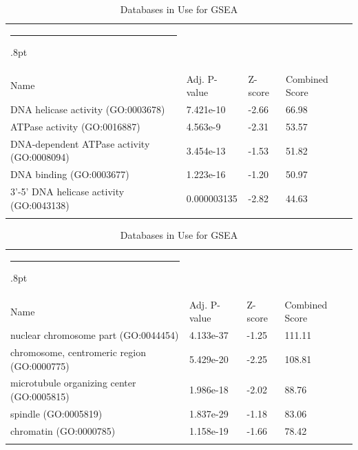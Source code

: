 \documentclass[3p,authoryear,preprint,12pt]{elsarticle}
\makeatletter
\def\hlinewd#1{%
  \noalign{\ifnum0=`}\fi\hrule \@height #1%
  \futurelet\reserved@a\@xhline}
\def\tbltoprule{\hlinewd{.8pt}\\[-12pt]}
\def\tblbottomrule{\noalign{\vspace*{6pt}}\hline\noalign{\vspace*{2pt}}}
\def\tblmidrule{\noalign{\vspace*{6pt}}\hline\noalign{\vspace*{2pt}}}
\makeatother
\begin{document}
\begin{table}[!htbp]
	\caption{{Databases in Use for GSEA} }
	\label{tw-de478ae31cc6}
	\def\arraystretch{1}
	\ignorespaces 
	\centering 
	\begin{tabulary}{\linewidth}{p{\dimexpr.65\tabcolsep}p{\dimexpr.15\tabcolsep}p{\dimexpr.1\tabcolsep}p{\dimexpr.1\tabcolsep}}
		\tbltoprule Name & Adj. P-value & Z-score & Combined Score\\
		\tblmidrule
DNA helicase activity (GO:0003678) & 7.421e-10 & -2.66 & 66.98 \\
ATPase activity (GO:0016887) & 4.563e-9 & -2.31 & 53.57 \\
DNA-dependent ATPase activity (GO:0008094) & 3.454e-13 & -1.53 & 51.82 \\
DNA binding (GO:0003677) & 1.223e-16 & -1.20 & 50.97 \\
3'-5' DNA helicase activity (GO:0043138) & 0.000003135 & -2.82 & 44.63 \\
		\tblbottomrule
	\end{tabulary}\par 
\end{table}
\begin{table}[!htbp]
	\caption{{Databases in Use for GSEA} }
	\label{tw-de478ae31cc6}
	\def\arraystretch{1}
	\ignorespaces 
	\centering 
	\begin{tabulary}{\linewidth}{p{\dimexpr.65\tabcolsep}p{\dimexpr.15\tabcolsep}p{\dimexpr.1\tabcolsep}p{\dimexpr.1\tabcolsep}}
		\tbltoprule Name & Adj. P-value & Z-score & Combined Score\\
		\tblmidrule
nuclear chromosome part (GO:0044454) & 4.133e-37 & -1.25 & 111.11 \\
chromosome, centromeric region (GO:0000775) & 5.429e-20 & -2.25 & 108.81 \\
microtubule organizing center (GO:0005815) & 1.986e-18 & -2.02 & 88.76 \\
spindle (GO:0005819) & 1.837e-29 & -1.18 & 83.06 \\
chromatin (GO:0000785) & 1.158e-19 & -1.66 & 78.42 \\
		\tblbottomrule
	\end{tabulary}\par 
\end{table}
\end{document}
